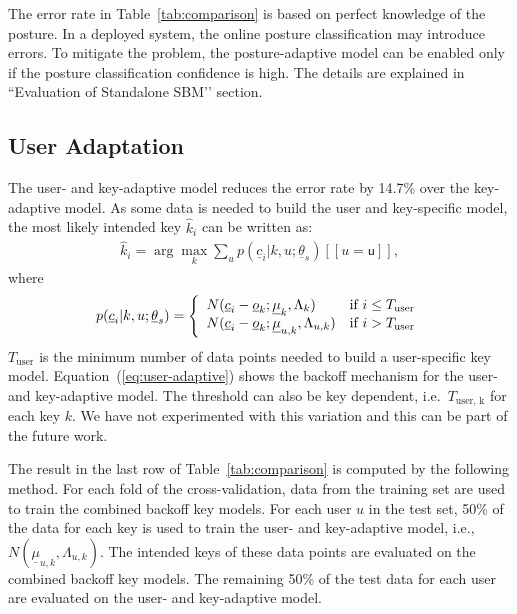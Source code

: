 \documentclass{sigchi}
\begin{document}
The error rate in Table~\ref{tab:comparison} is based on perfect knowledge of
the posture. In a deployed system, the online posture classification may
introduce errors. To mitigate the problem, the posture-adaptive model can be enabled only
if the posture classification confidence is high. The details are explained in ``Evaluation of Standalone SBM’’ section.

\subsection{User Adaptation}
The user- and key-adaptive model reduces the error rate by 14.7\% over the key-adaptive model. As some data is needed to build the user and key-specific model, the most likely intended key $\hat k_i$ can be written as:
\begin{align}          
\hat k_i = \arg\max_k \sum_{u} p(\underline c_i | k, u; \underline\theta_s)[[u = \textsf{u}]],
\end{align}
where
\begin{align}
p(\underline c_i | k, u; \underline\theta_s) = \left\{
  \begin{array}{l l}
  N(\underline c_i - \underline o_k; \underline \mu_{k}, \Lambda_{k}) & \text{if $i \le T_\text{user}$} \\
  N(\underline c_i -  \underline o_k; \underline \mu_{u, k}, \Lambda_{u, k}) & \text{if $i >T_\text{user}$} \\
\end{array} \right. \label{eq:user-adaptive}
\end{align}
$T_\text{user}$ is the minimum number of data points needed to build a user-specific key model. Equation~(\ref{eq:user-adaptive}) 
shows the backoff mechanism for the user- and key-adaptive model. The threshold can also be key dependent, i.e.\ $T_\text{user, k}$ for each key $k$. We have not experimented with this variation and this can be part of the future work.

The result in the last row of Table~\ref{tab:comparison} is computed by the 
following method. For each fold of the cross-validation, data from the training set are used to 
train the combined backoff key models. For each user $u$ in the test set,
50\% of the data for each key is used to train the user- and key-adaptive
model, i.e., $N(\underline \mu_{u, k}, \Lambda_{u, k})$.
The intended keys of these data points are evaluated on the combined backoff key models.
The remaining 50\% of the test data for each user are evaluated on the user- and key-adaptive 
model. 
\end{document}
